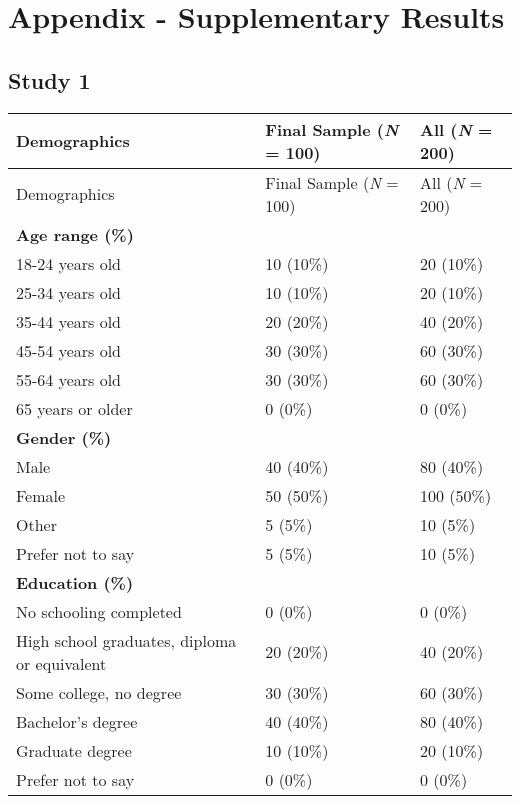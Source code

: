 
\section{Appendix - Supplementary Results}
\label{Appendix B}

\subsection*{Study 1}

\begin{longtable}{p{} p{} p{}}

\toprule
Demographics & Final Sample (\textit{N} = 100) & All (\textit{N} = 200)\\
\midrule
\endfirsthead

\toprule
Demographics & Final Sample (\textit{N} = 100) & All (\textit{N} = 200)\\
\midrule
\endhead

\textbf{Age range (\%)} & \\
18-24 years old & 10 (10\%) & 20 (10\%) \\
25-34 years old & 10 (10\%) & 20 (10\%) \\
35-44 years old & 20 (20\%) & 40 (20\%) \\
45-54 years old & 30 (30\%) & 60 (30\%) \\
55-64 years old & 30 (30\%) & 60 (30\%) \\
65 years or older & 0 (0\%) & 0 (0\%) \\

\textbf{Gender (\%)} & \\
Male & 40 (40\%) & 80 (40\%) \\
Female & 50 (50\%) & 100 (50\%) \\
Other & 5 (5\%) & 10 (5\%) \\
Prefer not to say & 5 (5\%) & 10 (5\%) \\

\textbf{Education (\%)} & \\ 
No schooling completed & 0 (0\%) & 0 (0\%) \\
High school graduates, diploma or equivalent & 20 (20\%) & 40 (20\%) \\
Some college, no degree & 30 (30\%) & 60 (30\%) \\
Bachelor's degree & 40 (40\%)  & 80 (40\%) \\
Graduate degree & 10 (10\%) & 20 (10\%) \\
Prefer not to say & 0 (0\%) & 0 (0\%) \\


\end{longtable}
